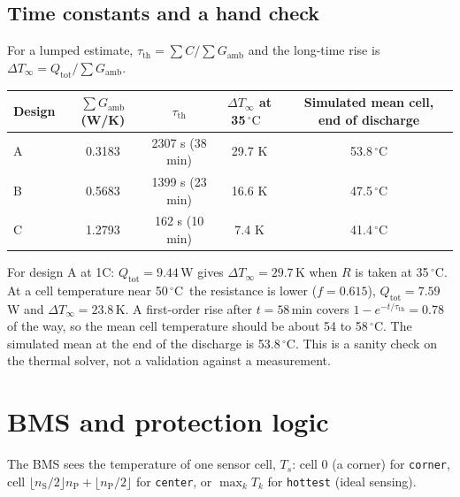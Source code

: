 \documentclass[11pt,a4paper]{article}
\newcommand{\degC}{\ensuremath{{}^{\circ}\mathrm{C}}}
\newcommand{\nS}{n_{\mathrm{S}}}
\newcommand{\nP}{n_{\mathrm{P}}}
\begin{document}
\subsection{Time constants and a hand check}
For a lumped estimate, $\tau_{\mathrm{th}}=\sum C/\sum G_{\mathrm{amb}}$ and the long-time rise is $\Delta T_\infty=Q_{\mathrm{tot}}/\sum G_{\mathrm{amb}}$.
\begin{center}
\begin{tabular}{@{}lcccc@{}}
\toprule
Design & $\sum G_{\mathrm{amb}}$ (W/K) & $\tau_{\mathrm{th}}$ & $\Delta T_\infty$ at 35\,\degC\ & Simulated mean cell, end of discharge \\
\midrule
A & 0.3183 & 2307 s (38 min) & 29.7 K & 53.8\,\degC \\
B & 0.5683 & 1399 s (23 min) & 16.6 K & 47.5\,\degC \\
C & 1.2793 & 162 s (10 min) & 7.4 K & 41.4\,\degC \\
\bottomrule
\end{tabular}
\end{center}
For design A at 1C: $Q_{\mathrm{tot}}=9.44$\,W gives $\Delta T_\infty=29.7$\,K when $R$ is taken at 35\,\degC. At a cell temperature near 50\,\degC\ the resistance is lower ($f=0.615$), $Q_{\mathrm{tot}}=7.59$\,W and $\Delta T_\infty=23.8$\,K. A first-order rise after $t=58$\,min covers $1-e^{-t/\tau_{\mathrm{th}}}=0.78$ of the way, so the mean cell temperature should be about 54 to 58\,\degC. The simulated mean at the end of the discharge is 53.8\,\degC. This is a sanity check on the thermal solver, not a validation against a measurement.

\section{BMS and protection logic}\label{sec:bms}
The BMS sees the temperature of one sensor cell, $T_s$: cell 0 (a corner) for \texttt{corner}, cell $\lfloor \nS/2\rfloor\nP+\lfloor\nP/2\rfloor$ for \texttt{center}, or $\max_k T_k$ for \texttt{hottest} (ideal sensing).
\end{document}
